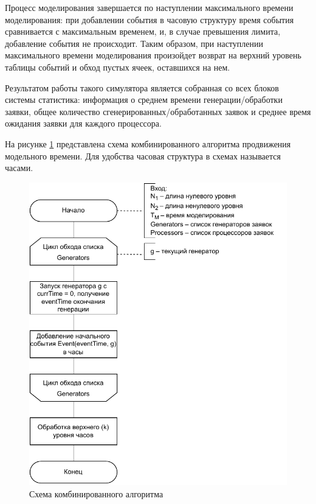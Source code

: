 Процесс моделирования завершается по наступлении максимального времени моделирования: при добавлении события в часовую структуру время события сравнивается с максимальным временем, и, в случае превышения лимита, добавление события не происходит. Таким образом, при наступлении максимального времени моделирования произойдет возврат на верхний уровень таблицы событий и обход пустых ячеек, оставшихся на нем.


Результатом работы такого симулятора является собранная со всех блоков системы статистика:
информация о среднем времени генерации/обработки заявки, общее количество сгенерированных/обработанных заявок и среднее время ожидания заявки для каждого процессора.

\clearpage
На рисунке \ref{img:hybrid_simulate_schema} представлена схема комбинированного алгоритма продвижения модельного времени. Для удобства часовая структура в схемах называется часами.
\begin{figure}[h!btp]
	\centering
	\includegraphics[width=1\columnwidth]{inc/img/hybrid_simulate_schema.pdf}
	\caption{Схема комбинированного алгоритма}
	\label{img:hybrid_simulate_schema}	
\end{figure}

